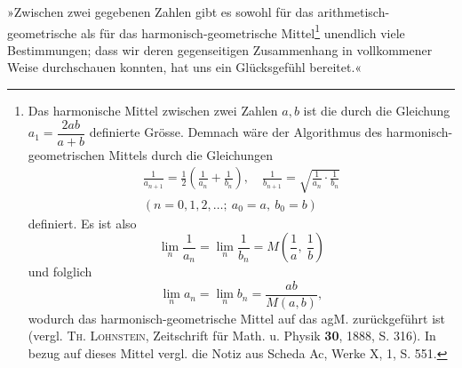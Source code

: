 »Zwischen zwei gegebenen Zahlen gibt es sowohl für das arithmetisch-geometrische als für das harmonisch-geometrische Mittel\footnote{Das harmonische Mittel zwischen zwei Zahlen \(a,b\) ist die durch die Gleichung \(a_1=\dfrac{2ab}{a+b}\) definierte Grösse. Demnach wäre der Algorithmus des harmonisch-geometrischen Mittels durch die Gleichungen
\[
\begin{gathered}
\frac1{a_{n+1}}=\frac12\left(\frac1{a_n}+\frac1{b_n}\right),\quad
\frac1{b_{n+1}}=\sqrt{\frac1{a_n}\cdot\frac1{b_n}}\\
(n=0,1,2,\ldots;\ a_0=a,\ b_0=b)
\end{gathered}
\]
definiert. Es ist also
\[
\lim_n\frac1{a_n}=\lim_n\frac1{b_n}=M\left(\frac1a,\ \frac1b\right)
\]
und folglich
\[
\lim_n a_n=\lim_n b_n=\frac{ab}{M(a,b)},
\]
wodurch das harmonisch-geometrische Mittel auf das agM. zurückgeführt ist (vergl. \textsc{Th. Lohnstein}, Zeitschrift für Math. u. Physik \textbf{30}, 1888, S. 316). In bezug auf dieses Mittel vergl. die Notiz aus Scheda Ac, Werke X, 1, S. 551.} unendlich viele Bestimmungen; dass wir deren gegenseitigen Zusammenhang in vollkommener
Weise durchschauen konnten, hat uns ein Glücksgefühl bereitet.«

